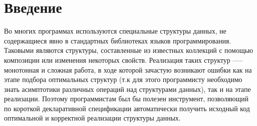 \documentclass[14pt]{matmex-diploma}
\begin{document}
\maketitle
\tableofcontents
\section*{Введение}
Во многих программах используются специальные структуры данных, не содержащиеся явно в стандартных библиотеках языков программирования. Таковыми являются структуры, составленные из известных коллекций с помощью композиции или изменения некоторых свойств. Реализация таких структур —-- монотонная и сложная работа, в ходе которой зачастую возникают ошибки как на этапе подбора оптимальных структур (т.к для этого программисту необходимо знать асимптотики различных операций над структурами данных), так и на этапе реализации. Поэтому программистам был бы полезен инструмент, позволяющий по короткой декларативной спецификации автоматически получить исходный код оптимальной и корректной реализации структуры данных.
\end{document}
